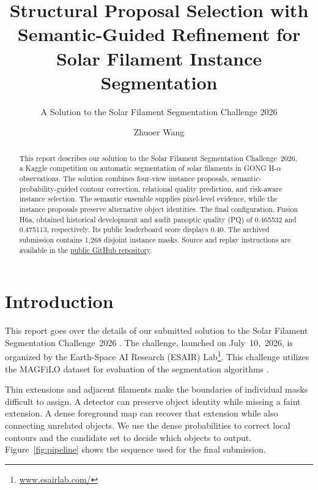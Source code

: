 \documentclass[sigconf]{acmart}
\begin{document}
\title[Structural Proposal Selection for Solar Filaments]{Structural Proposal Selection with Semantic-Guided Refinement for Solar Filament Instance Segmentation}
\subtitle{A Solution to the Solar Filament Segmentation Challenge 2026}
\author{Zhuoer Wang}

\begin{abstract}
This report describes our solution to the Solar Filament Segmentation Challenge~2026, a Kaggle competition on automatic segmentation of solar filaments in GONG H-$\alpha$ observations. The solution combines four-view instance proposals, semantic-probability-guided contour correction, relational quality prediction, and risk-aware instance selection. The semantic ensemble supplies pixel-level evidence, while the instance proposals preserve alternative object identities. The final configuration, Fusion H6a, obtained historical development and audit panoptic quality (PQ) of 0.465532 and 0.475113, respectively. Its public leaderboard score displays 0.40. The archived submission contains 1,268 disjoint instance masks. Source and replay instructions are available in the \href{https://github.com/wangzgui/solar-filament-segmentation-2026}{public GitHub repository}.
\end{abstract}

\maketitle

\section{Introduction}
This report goes over the details of our submitted solution to the Solar Filament Segmentation Challenge~2026 \cite{filament-segmentation-2026}. The challenge, launched on July~10,~2026, is organized by the Earth-Space AI Research (ESAIR) Lab\footnote{\href{https://www.esairlab.com/home}{www.esairlab.com/}}. This challenge utilizes the MAGFiLO dataset for evaluation of the segmentation algorithms \cite{ahmadzadeh2024dataset}.

Thin extensions and adjacent filaments make the boundaries of individual masks difficult to assign. A detector can preserve object identity while missing a faint extension. A dense foreground map can recover that extension while also connecting unrelated objects. We use the dense probabilities to correct local contours and the candidate set to decide which objects to output. Figure~\ref{fig:pipeline} shows the sequence used for the final submission.
\end{document}
